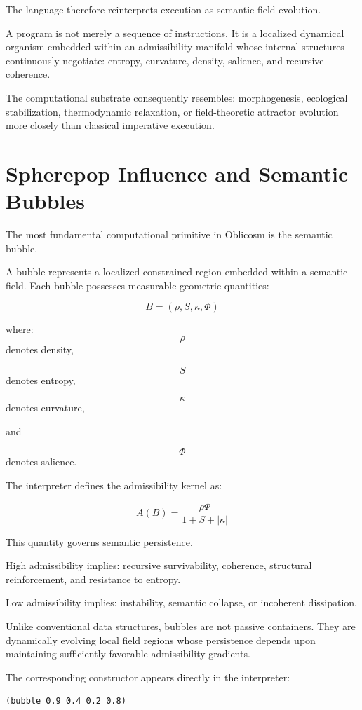 \documentclass[11pt]{article}
\begin{document}
The language therefore reinterprets execution as semantic field evolution.

A program is not merely a sequence of instructions. It is a localized dynamical organism embedded within an admissibility manifold whose internal structures continuously negotiate:
entropy,
curvature,
density,
salience,
and recursive coherence.

The computational substrate consequently resembles:
morphogenesis,
ecological stabilization,
thermodynamic relaxation,
or field-theoretic attractor evolution
more closely than classical imperative execution.

\section{Spherepop Influence and Semantic Bubbles}

The most fundamental computational primitive in Oblicosm is the semantic bubble.

A bubble represents a localized constrained region embedded within a semantic field. Each bubble possesses measurable geometric quantities:

\[
B =
(\rho, S, \kappa, \Phi)
\]

where:
\[
\rho
\]
denotes density,

\[
S
\]
denotes entropy,

\[
\kappa
\]
denotes curvature,

and

\[
\Phi
\]
denotes salience.

The interpreter defines the admissibility kernel as:

\[
A(B)
=
\frac{\rho \Phi}
{1 + S + |\kappa|}
\]

This quantity governs semantic persistence.

High admissibility implies:
recursive survivability,
coherence,
structural reinforcement,
and resistance to entropy.

Low admissibility implies:
instability,
semantic collapse,
or incoherent dissipation.

Unlike conventional data structures, bubbles are not passive containers. They are dynamically evolving local field regions whose persistence depends upon maintaining sufficiently favorable admissibility gradients.

The corresponding constructor appears directly in the interpreter:

\begin{lstlisting}
(bubble 0.9 0.4 0.2 0.8)
\end{lstlisting}
\end{document}
